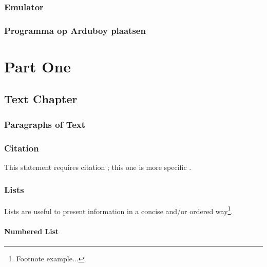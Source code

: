 \documentclass[11pt,fleqn]{book} %
\begin{document}
\section{Emulator}
\section{Programma op Arduboy plaatsen}



\part{Part One}


\chapter{Text Chapter}

\section{Paragraphs of Text}

\lipsum[1-7] %


\section{Citation}

This statement requires citation \cite{article_key}; this one is more specific \cite[162]{book_key}.


\section{Lists}

Lists are useful to present information in a concise and/or ordered way\footnote{Footnote example...}.

\subsection{Numbered List}
\end{document}
